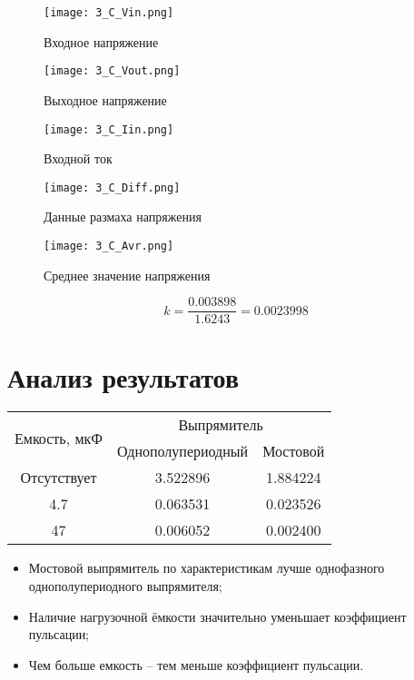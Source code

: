 \documentclass[a4paper,14pt]{article}
\begin{document}
\begin{figure}[H]
	\centering
	\texttt{[image: 3\_C\_Vin.png]}
	\caption{Входное напряжение}	
\end{figure}

\begin{figure}[H]
	\centering
	\texttt{[image: 3\_C\_Vout.png]}
	\caption{Выходное напряжение}	
\end{figure}

\begin{figure}[H]
	\centering
	\texttt{[image: 3\_C\_Iin.png]}
	\caption{Входной ток}	
\end{figure}

\begin{figure}[H]
	\centering
	\texttt{[image: 3\_C\_Diff.png]}
	\caption{Данные размаха напряжения}	
\end{figure}

\begin{figure}[H]
	\centering
	\texttt{[image: 3\_C\_Avr.png]}
	\caption{Среднее значение напряжения}	
\end{figure}

$$k = \frac{0.003898}{1.6243} = 0.0023998$$

\section{Анализ результатов}

\begin{table}[H]
	\begin{center}
	\begin{tabular}{|c|c|c|}
		\hline
		\multirow{2}{*}{Емкость, мкФ} & \multicolumn{2}{c|}{Выпрямитель} \\ \cline{2-3} 
		& Однополупериодный   & Мостовой   \\ \hline
		Отсутствует              & 3.522896            & 1.884224   \\ \hline
		4.7                      & 0.063531            & 0.023526   \\ \hline
		47                       & 0.006052            & 0.002400   \\ \hline
	\end{tabular}
	\end{center}
\end{table}

\begin{itemize}
	\item Мостовой выпрямитель по характеристикам лучше однофазного однополупериодного выпрямителя;
	\item Наличие нагрузочной ёмкости значительно уменьшает коэффициент пульсации;
	\item Чем больше емкость -- тем меньше коэффициент пульсации.
\end{itemize}
\end{document}
